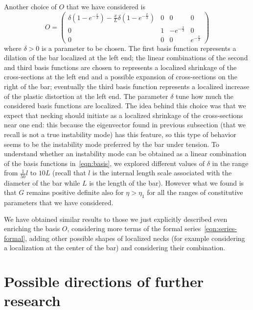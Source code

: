 \documentclass[a4paper,10pt,oneside]{amsbook}
\numberwithin{section}{chapter}
\numberwithin{equation}{chapter}
\theoremstyle{definition}
\begin{document}
Another choice of $O$ that we have considered is
\begin{equation}
\label{eqn:basis}
O=\begin{pmatrix}
\delta\left(1-e^{-\frac{x}{\delta}}\right)-\frac{x}{L}\delta\left(1-e^{-\frac{L}{\delta}}\right) & 0 & 0 & 0 \\
0 & 1 & -e^{-\frac{x}{\delta}} & 0 \\
0 & 0 & 0 & e^{-\frac{x}{\delta}}
\end{pmatrix}
\end{equation}
where $\delta>0$ is a parameter to be chosen. The first basis function represents a dilation of the bar localized at the left end; the linear combinations of the second and third basis functions are chosen to represents a localized shrinkage of the cross-sections at the left end and a possible expansion of cross-sections on the right of the bar; eventually the third basis function represents a localized increase of the plastic distortion at the left end. The parameter $\delta$ tune how much the considered basis functions are localized. The idea behind this choice was that we expect that necking should initiate as a localized shrinkage of the cross-sections near one end: this because the eigenvector found in previous subsection (that we recall is not a true instability mode) has this feature, so this type of behavior seems to be the instability mode preferred by the bar under tension. To understand whether an instability mode can be obtained as a linear combination of the basis functions in~\eqref{eqn:basis}, we explored different values of $\delta$ in the range from $\frac{1}{50}l$ to $10 L$ (recall that $l$ is the internal length scale associated with the diameter of the bar while $L$ is the length of the bar). However what we found is that $G$ remains positive definite also for $\eta>\eta_1$ for all the ranges of constitutive parameters that we have considered.

We have obtained similar results to those we just explicitly described even enriching the basis $O$, considering more terms of the formal series~\eqref{eqn:series-formal}, adding other possible shapes of localized necks (for example considering a localization at the center of the bar) and considering their combination.


\section{Possible directions of further research}
\label{sec:directions-necking}
\end{document}
